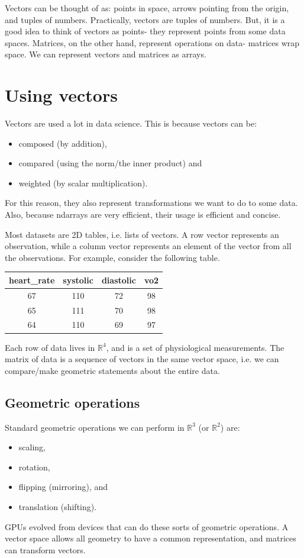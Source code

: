 \documentclass[a4paper, openany]{memoir}
\begin{document}
    Vectors can be thought of as: points in space, arrows pointing from the origin, and tuples of numbers. Practically, vectors are tuples of numbers. But, it is a good idea to think of vectors as points- they represent points from some data spaces. Matrices, on the other hand, represent operations on data- matrices wrap space. We can represent vectors and matrices as arrays.

    \section{Using vectors}
    Vectors are used a lot in data science. This is because vectors can be:
    \begin{itemize}
        \item composed (by addition),
        \item compared (using the norm/the inner product) and
        \item weighted (by scalar multiplication).
    \end{itemize}
    For this reason, they also represent transformations we want to do to some data. Also, because ndarrays are very efficient, their usage is efficient and concise.

    Most datasets are 2D tables, i.e. lists of vectors. A row vector represents an observation, while a column vector represents an element of the vector from all the observations. For example, consider the following table.
    \begin{table}[H]
        \centering
        \begin{tabular}{|c|c|c|c|}
            \hline
            heart\_rate & systolic & diastolic & vo2 \\
            \hline
            67 & 110 & 72 & 98 \\
            65 & 111 & 70 & 98 \\
            64 & 110 & 69 & 97 \\
            \hline
        \end{tabular}
    \end{table}
    \noindent Each row of data lives in $\mathbb{R}^4$, and is a set of physiological measurements. The matrix of data is a sequence of vectors in the same vector space, i.e. we can compare/make geometric statements about the entire data.

    \subsection{Geometric operations}
    Standard geometric operations we can perform in $\mathbb{R}^3$ (or $\mathbb{R}^2$) are:
    \begin{itemize}
        \item scaling,
        \item rotation,
        \item flipping (mirroring), and
        \item translation (shifting).
    \end{itemize}
    GPUs evolved from devices that can do these sorts of geometric operations. A vector space allows all geometry to have a common representation, and matrices can transform vectors.
\end{document}
